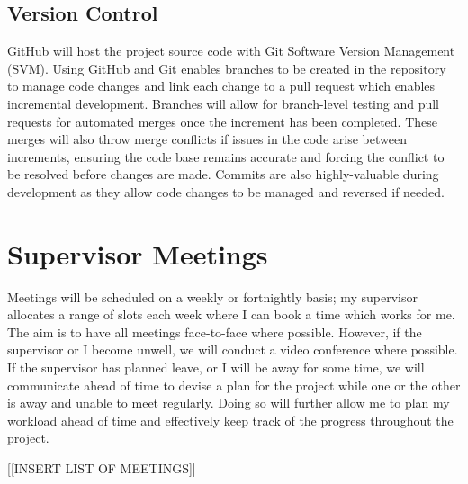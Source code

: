 \subsection{Version Control}
\label{pm:version_control}

GitHub will host the project source code with Git Software Version Management (SVM). Using GitHub and Git enables branches to be created in the repository to manage code changes and link each change to a pull request which enables incremental development. Branches will allow for branch-level testing and pull requests for automated merges once the increment has been completed. These merges will also throw merge conflicts if issues in the code arise between increments, ensuring the code base remains accurate and forcing the conflict to be resolved before changes are made. Commits are also highly-valuable during development as they allow code changes to be managed and reversed if needed. 

\section{Supervisor Meetings}
\label{pm:supervisor_meetings}

Meetings will be scheduled on a weekly or fortnightly basis; my supervisor allocates a range of slots each week where I can book a time which works for me. The aim is to have all meetings face-to-face where possible. However, if the supervisor or I become unwell, we will conduct a video conference where possible. If the supervisor has planned leave, or I will be away for some time, we will communicate ahead of time to devise a plan for the project while one or the other is away and unable to meet regularly. Doing so will further allow me to plan my workload ahead of time and effectively keep track of the progress throughout the project.

[[INSERT LIST OF MEETINGS]]